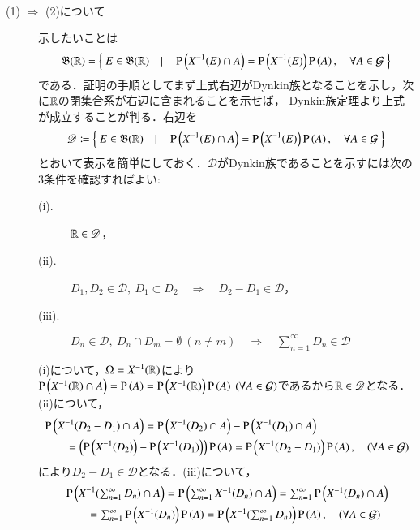 	\begin{prf}\mbox{}\\
		\begin{description}
			\item[(1) $\Rightarrow$ (2)について] 
				示したいことは
				\begin{align}
					\mathfrak{B}(\mathbb{R}) = \left\{\ E \in \mathfrak{B}(\mathbb{R})\quad |\quad \operatorname{P} \left(X^{-1}(E) \cap A\right) = \operatorname{P} \left(X^{-1}(E)\right)\operatorname{P} \left(A\right), \quad \forall A \in \mathcal{G}\ \right\}
				\end{align}
				である．証明の手順としてまず上式右辺がDynkin族となることを示し，次に$\mathbb{R}$の閉集合系が右辺に含まれることを示せば，
				Dynkin族定理より上式が成立することが判る．右辺を
				\begin{align}
					\mathscr{D} \coloneqq \left\{\ E \in \mathfrak{B}(\mathbb{R})\quad |\quad \operatorname{P} \left(X^{-1}(E) \cap A\right) = \operatorname{P} \left(X^{-1}(E)\right)\operatorname{P} \left(A\right), \quad \forall A \in \mathcal{G}\ \right\}
				\end{align}
				とおいて表示を簡単にしておく．$\mathscr{D}$がDynkin族であることを示すには次の3条件を確認すればよい:
				\begin{description}
					\item[\rm{(i).}] $\mathbb{R} \in \mathscr{D}$，
					\item[\rm{(ii).}] $D_1,D_2 \in \mathscr{D},\ D_1 \subset D_2\quad \Rightarrow\quad D_2 - D_1 \in \mathscr{D}$，
					\item[\rm{(iii).}] $D_n \in \mathscr{D},\ D_n \cap D_m = \emptyset\ (n \neq m)\quad \Rightarrow\quad \sum_{n=1}^{\infty} D_n \in \mathscr{D}$
				\end{description}
				(i)について，$\Omega = X^{-1}(\mathbb{R})$により$\operatorname{P} \left(X^{-1}(\mathbb{R}) \cap A\right) = \operatorname{P} \left(A\right) = \operatorname{P} \left(X^{-1}(\mathbb{R})\right)\operatorname{P} \left(A\right)\ (\forall A \in \mathcal{G})$であるから$\mathbb{R} \in \mathscr{D}$となる．
				(ii)について，
				\begin{align}
					&\operatorname{P} \left(X^{-1}(D_2 - D_1) \cap A\right) = \operatorname{P} \left(X^{-1}(D_2) \cap A\right) - \operatorname{P} \left(X^{-1}(D_1) \cap A\right) \\
					&\qquad = \left( \operatorname{P} \left(X^{-1}(D_2)\right) - \operatorname{P} \left(X^{-1}(D_1)\right) \right)\operatorname{P} \left(A\right)
					= \operatorname{P} \left(X^{-1}(D_2 - D_1)\right)\operatorname{P} \left(A\right),\quad (\forall A \in \mathcal{G})
				\end{align}
				により$D_2 - D_1 \in \mathscr{D}$となる．(iii)について，
				\begin{align}
					&\prob{X^{-1}(\textstyle\sum_{n=1}^{\infty} D_n) \cap A} = \prob{\textstyle\sum_{n=1}^{\infty} X^{-1}(D_n) \cap A} = \textstyle\sum_{n=1}^{\infty} \prob{X^{-1}(D_n) \cap A} \\
					&\qquad = \textstyle\sum_{n=1}^{\infty} \prob{X^{-1}(D_n)}\prob{A} = \prob{X^{-1}(\textstyle\sum_{n=1}^{\infty} D_n)}\prob{A},\quad (\forall A \in \mathcal{G})

\end{align}
\end{description}
\end{prf}
